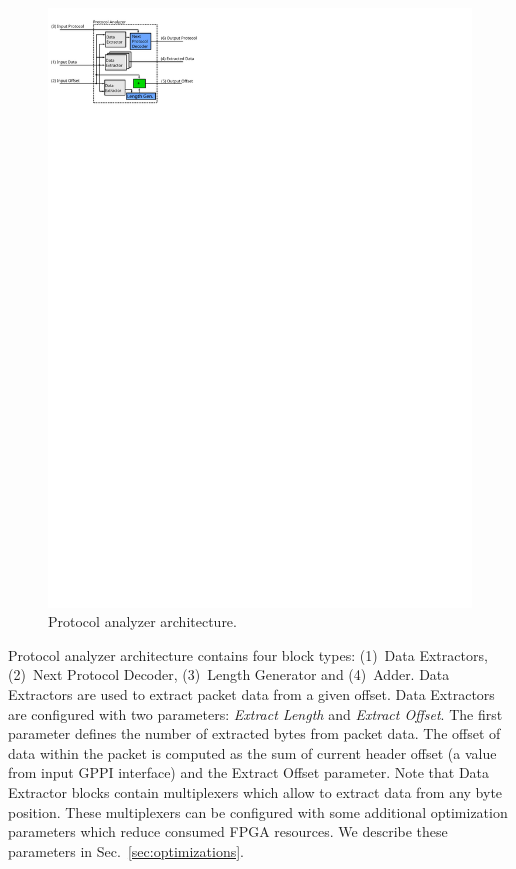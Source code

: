 \begin{figure}[ht]
    \centering
    \includegraphics[scale=1.25]{chapters/pic/ProtocolAnalyzer}
    \caption{Protocol analyzer architecture.}
    \label{fig:protocolArch}
\end{figure}    

Protocol analyzer architecture contains four block types: (1)~Data Extractors, (2)~Next Protocol Decoder, 
(3)~Length Generator and (4)~Adder. Data Extractors are used to extract packet data from a given offset. 
Data Extractors are configured with two parameters: \textit{Extract Length} and \textit{Extract Offset}. 
The first parameter defines the number of extracted bytes from packet data. The offset of data within the packet is computed as the sum
of current header offset (a value from input GPPI interface) and the Extract Offset parameter.
Note that Data Extractor blocks contain multiplexers which allow to extract data from any byte position. 
These multiplexers can be configured with some additional optimization parameters which  
reduce consumed FPGA resources. We describe these parameters in Sec.~\ref{sec:optimizations}.


